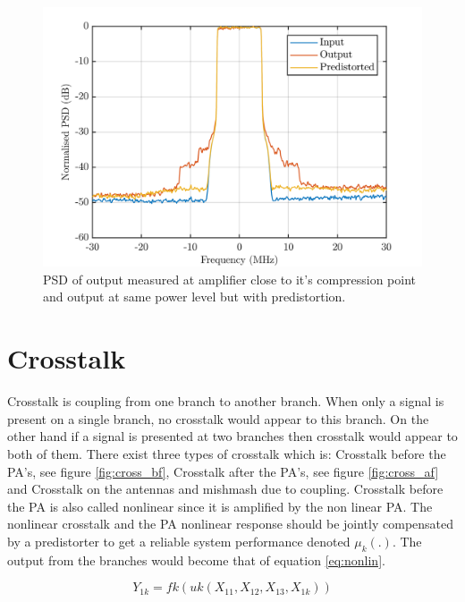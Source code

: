 \begin{figure}[H]
\centering 
\includegraphics[scale = 0.7]{figures/measurement/psd_dpd.png}
\caption{PSD of output measured at amplifier close to it's compression point and output at same power level but with predistortion. }
\label{fig:dpd_psd}
\end{figure}



\section{Crosstalk}
Crosstalk is coupling from one branch to another branch. When only a signal is present on a single branch, no crosstalk would appear to this branch. On the other hand if a signal is presented at two branches then crosstalk would appear to both of them. There exist three types of crosstalk which is: Crosstalk before the PA's, see figure \ref{fig:cross_bf}, Crosstalk after the PA's, see figure \ref{fig:cross_af} and Crosstalk on the antennas and mishmash due to coupling. Crosstalk before the PA is also called nonlinear since it is amplified by the non linear PA. The nonlinear crosstalk and the PA nonlinear response should be jointly
compensated by a predistorter to get a reliable system performance \citep{islam2017} denoted $\mu_k (.)$. The output from the branches would become that of equation \ref{eq:nonlin}.

\begin{equation} \label{eq:nonlin}
Y_{1k} = fk(uk(X_{11},X_{12},X_{13},X_{1k}))
\end{equation}   

